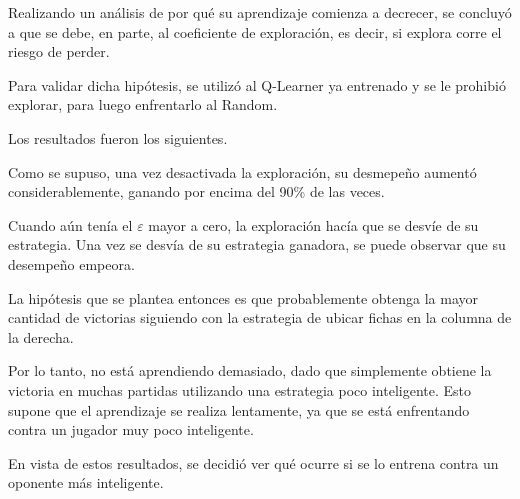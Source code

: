 Realizando un análisis de por qué su aprendizaje comienza a decrecer, se concluyó a que se debe, en parte, al coeficiente de exploración, es decir, si explora corre el riesgo de  perder.

Para validar dicha hipótesis, se utilizó al Q-Learner ya entrenado y se le prohibió explorar, para luego enfrentarlo al Random.

Los resultados fueron los siguientes.



Como se supuso, una vez desactivada la exploración, su desmepeño aumentó considerablemente, ganando por encima del 90\% de las veces.

Cuando aún tenía el $\varepsilon$ mayor a cero, la exploración hacía que se desvíe de su estrategia. Una vez se desvía de su estrategia ganadora, se puede observar que su desempeño empeora.

La hipótesis que se plantea entonces es que probablemente obtenga la mayor cantidad de victorias siguiendo con la estrategia de ubicar fichas en la columna de la derecha.

Por lo tanto, no está aprendiendo demasiado, dado que simplemente obtiene la victoria en muchas partidas utilizando una estrategia poco inteligente. Esto supone que el aprendizaje se realiza lentamente, ya que se está enfrentando contra un jugador muy poco inteligente.

En vista de estos resultados, se decidió ver qué ocurre si se lo entrena contra un oponente más inteligente.
